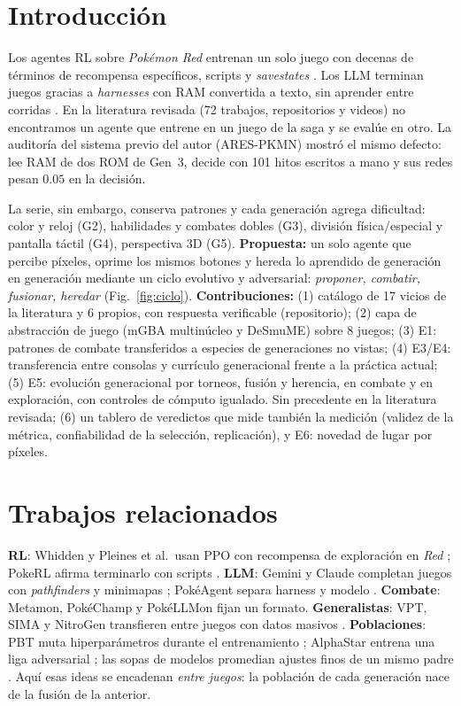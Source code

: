 \documentclass[conference]{IEEEtran}
\begin{document}
\section{Introducción}
Los agentes RL sobre \emph{Pokémon Red} entrenan un solo juego con decenas de términos de recompensa específicos, scripts y \emph{savestates} \cite{pleines2025pokemonred,rubinstein2025pokerl}. Los LLM terminan juegos gracias a \emph{harnesses} con RAM convertida a texto, sin aprender entre corridas \cite{gemini25report,karten2026pokeagent}. En la literatura revisada (72 trabajos, repositorios y videos) no encontramos un agente que entrene en un juego de la saga y se evalúe en otro. La auditoría del sistema previo del autor (ARES-PKMN) mostró el mismo defecto: lee RAM de dos ROM de Gen~3, decide con 101 hitos escritos a mano y sus redes pesan $0.05$ en la decisión.

La serie, sin embargo, conserva patrones y cada generación agrega dificultad: color y reloj (G2), habilidades y combates dobles (G3), división física/especial y pantalla táctil (G4), perspectiva 3D (G5). \textbf{Propuesta:} un solo agente que percibe píxeles, oprime los mismos botones y hereda lo aprendido de generación en generación mediante un ciclo evolutivo y adversarial: \emph{proponer, combatir, fusionar, heredar} (Fig.~\ref{fig:ciclo}). \textbf{Contribuciones:}
(1) catálogo de 17 vicios de la literatura y 6 propios, con respuesta verificable (repositorio);
(2) capa de abstracción de juego (mGBA multinúcleo y DeSmuME) sobre 8 juegos;
(3) E1: patrones de combate transferidos a especies de generaciones no vistas;
(4) E3/E4: transferencia entre consolas y currículo generacional frente a la práctica actual;
(5) E5: evolución generacional por torneos, fusión y herencia, en combate y en exploración, con controles de cómputo igualado. Sin precedente en la literatura revisada;
(6) un tablero de veredictos que mide también la medición (validez de la métrica, confiabilidad de la selección, replicación), y E6: novedad de lugar por píxeles.

\section{Trabajos relacionados}
\textbf{RL}: Whidden y Pleines et al.\ usan PPO con recompensa de exploración en \emph{Red} \cite{whidden2023pokemonred,pleines2025pokemonred}; PokeRL afirma terminarlo con scripts \cite{rubinstein2025pokerl}. \textbf{LLM}: Gemini y Claude completan juegos con \emph{pathfinders} y minimapas \cite{gemini25report,bradshaw2026yearlate}; PokéAgent separa harness y modelo \cite{karten2026pokeagent}. \textbf{Combate}: Metamon, PokéChamp y PokéLLMon \cite{grigsby2025metamon,karten2025pokechamp,hu2024pokellmon} fijan un formato. \textbf{Generalistas}: VPT, SIMA y NitroGen transfieren entre juegos con datos masivos \cite{baker2022vpt,sima2024,nitrogen2026}. \textbf{Poblaciones}: PBT muta hiperparámetros durante el entrenamiento \cite{jaderberg2017pbt}; AlphaStar entrena una liga adversarial \cite{vinyals2019alphastar}; las sopas de modelos promedian ajustes finos de un mismo padre \cite{wortsman2022soups}. Aquí esas ideas se encadenan \emph{entre juegos}: la población de cada generación nace de la fusión de la anterior.
\end{document}
